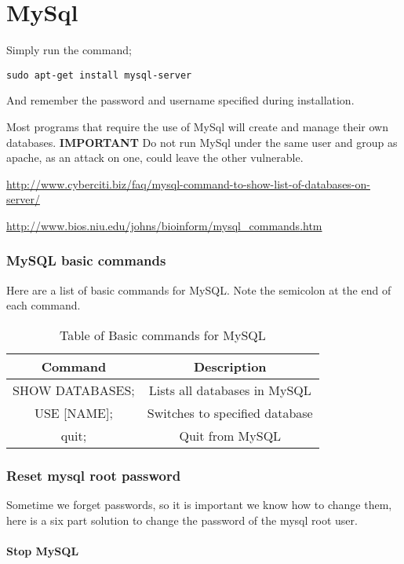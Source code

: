 \chapter{MySql}
\label{chp:mysql}

Simply run the command;
\begin{lstlisting}
sudo apt-get install mysql-server
\end{lstlisting}

And remember the password and username specified during installation.

Most programs that require the use of MySql will create and manage their own databases.
\vspace{2cm}
\textbf{IMPORTANT} Do not run MySql under the same user and group as apache, as an attack on one, could leave the other vulnerable.

\url{http://www.cyberciti.biz/faq/mysql-command-to-show-list-of-databases-on-server/}

\url{http://www.bios.niu.edu/johns/bioinform/mysql_commands.htm}

\subsection{MySQL basic commands}

Here are a list of basic commands for MySQL. Note the semicolon at the end of each command.

\begin{table}[htb]
\begin{tabular}{cc}
\hline
Command & Description\\
\hline
SHOW DATABASES; & Lists all databases in MySQL\\
USE [NAME]; & Switches to specified database\\
quit; & Quit from MySQL\\
\hline
\end{tabular}
\caption{Table of Basic commands for MySQL}
\label{tab:mysqlComm}
\end{table}

\subsection{Reset mysql root password}
\label{sec:mysqlresetpass}

Sometime we forget passwords, so it is important we know how to change them, here is a six part solution to change the password of the mysql root user.

\subsubsection{Stop MySQL}

